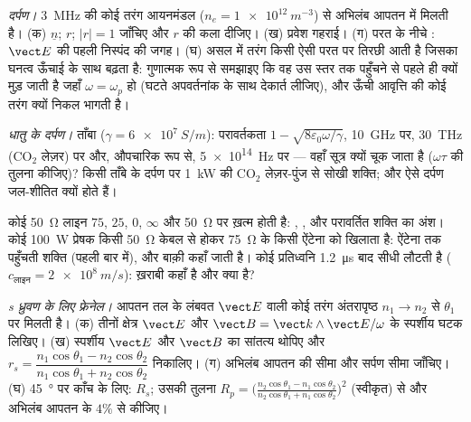 \begin{exercise}[$\star\star$]\label{exo:b2:wave-interfaces:7}
\emph{ दर्पण।} \qty{3}{MHz} की कोई तरंग आयनमंडल ($n_e =
\qty{1e12}{m^{-3}}$) से अभिलंब आपतन में मिलती है। (क) $\underline n$; $r$; $|r| = 1$ जाँचिए और
$r$ की कला दीजिए। (ख) प्रवेश गहराई। (ग) परत के नीचे : $\vect E$ की पहली निस्पंद की जगह। (घ) असल में तरंग किसी ऐसी परत पर
तिरछी आती है जिसका घनत्व ऊँचाई के साथ बढ़ता है: गुणात्मक रूप से
समझाइए कि वह उस स्तर तक पहुँचने से पहले ही क्यों मुड़ जाती है जहाँ
$\omega = \omega_p$ हो (घटते अपवर्तनांक के साथ देकार्त लीजिए), और ऊँची आवृत्ति
की कोई तरंग क्यों निकल भागती है।
\end{exercise}

\begin{exercise}[$\star\star$]\label{exo:b2:wave-interfaces:8}
\emph{धातु के दर्पण।} ताँबा ($\gamma = \qty{6e7}{S/m}$): परावर्तकता $1 -
\sqrt{8\varepsilon_0\omega/\gamma}$, \qty{10}{GHz} पर, \qty{30}{THz} (CO$_2$ लेज़र) पर और,
औपचारिक रूप से, \qty{5e14}{Hz} पर --- वहाँ सूत्र क्यों चूक जाता है ($\omega\tau$
की तुलना कीजिए)? किसी ताँबे के दर्पण पर \qty{1}{kW} की CO$_2$ लेज़र-पुंज से
सोखी शक्ति; और ऐसे दर्पण जल-शीतित क्यों होते हैं।
\end{exercise}

\begin{exercise}[$\star\star$]\label{exo:b2:wave-interfaces:9}
कोई \qty{50}{\ohm} लाइन $75$, $25$, $0$, $\infty$ और \qty{50}{\ohm} पर ख़त्म होती है:
, , और परावर्तित शक्ति का
अंश। कोई \qty{100}{W} प्रेषक किसी \qty{50}{\ohm} केबल से होकर \qty{75}{\ohm} के
किसी ऐंटेना को खिलाता है: ऐंटेना तक पहुँचती शक्ति (पहली बार में),
और बाक़ी कहाँ जाती है। कोई प्रतिध्वनि \qty{1.2}{\micro s} बाद सीधी लौटती है ($c_{\text{लाइन}}
= \qty{2e8}{m/s}$): ख़राबी कहाँ है और क्या है?
\end{exercise}

\begin{exercise}[$\star\star\star$]\label{exo:b2:wave-interfaces:10}
\emph{s ध्रुवण के लिए फ्रेनेल।} आपतन तल के लंबवत $\vect E$ वाली कोई तरंग
अंतरापृष्ठ $n_1 \to n_2$ से $\theta_1$ पर मिलती है।
(क) तीनों क्षेत्र $\vect E$ और
$\vect B = \vect k\wedge\vect E/\omega$ के स्पर्शीय घटक लिखिए। (ख) स्पर्शीय
$\vect E$ और $\vect B$ का सांतत्य थोपिए और $r_s = \dfrac{n_1\cos\theta_1 - n_2\cos\theta_2}
{n_1\cos\theta_1 + n_2\cos\theta_2}$ निकालिए। (ग) अभिलंब आपतन की सीमा और
सर्पण सीमा जाँचिए। (घ) \qty{45}{\degree} पर काँच के लिए: $R_s$; उसकी तुलना $R_p
= \bigl(\frac{n_2\cos\theta_1 - n_1\cos\theta_2}{n_2\cos\theta_1 + n_1\cos\theta_2}\bigr)^2$
(स्वीकृत) से और अभिलंब आपतन के $4\%$ से कीजिए।
\end{exercise}

